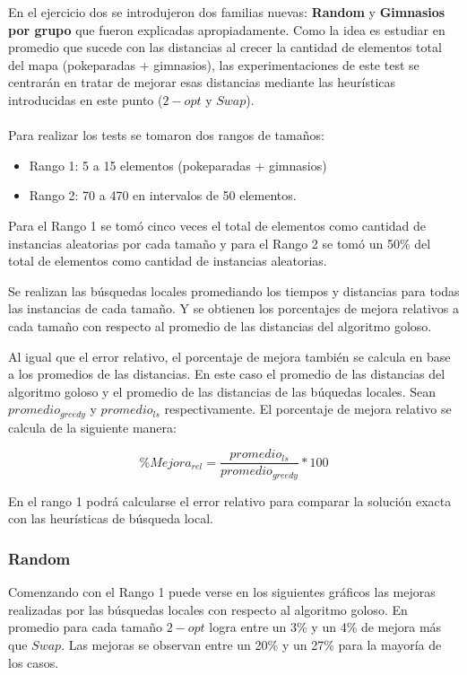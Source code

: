 \newpage

En el ejercicio dos se introdujeron dos familias nuevas: \textbf{Random} y \textbf{Gimnasios por grupo} que fueron explicadas apropiadamente. Como la idea es estudiar en promedio que sucede con las distancias al crecer la cantidad de elementos total del mapa (pokeparadas + gimnasios), las experimentaciones de este test se centrarán en tratar de mejorar esas distancias mediante las heurísticas introducidas en este punto ($2-opt$ y $Swap$).\\\\

Para realizar los tests se tomaron dos rangos de tamaños:
\begin{itemize}
\item Rango 1: 5 a 15 elementos (pokeparadas + gimnasios)
\item Rango 2: 70 a 470 en intervalos de 50 elementos.
\end{itemize}

Para el Rango 1 se tomó cinco veces el total de elementos como cantidad de instancias aleatorias por cada tamaño y para el Rango 2 se tomó un 50\% del total de elementos como cantidad de instancias aleatorias.

Se realizan las búsquedas locales promediando los tiempos y distancias para todas las instancias de cada tamaño. Y se obtienen los porcentajes de mejora relativos a cada tamaño con respecto al promedio de las distancias del algoritmo goloso.

Al igual que el error relativo, el porcentaje de mejora también se calcula en base a los promedios de las distancias. En este caso el promedio de las distancias del algoritmo goloso y el promedio de las distancias de las búquedas locales. Sean $promedio_{greedy}$ y $promedio_{ls}$ respectivamente. El porcentaje de mejora relativo se calcula de la siguiente manera:

\begin{equation}
\%Mejora_{rel} = \frac{promedio_{ls}}{promedio_{greedy}} \ast 100
\end{equation}

En el rango 1 podrá calcularse el error relativo para comparar la solución exacta con las heurísticas de búsqueda local.

\subsubsection*{Random}

Comenzando con el Rango 1 puede verse en los siguientes gráficos las mejoras realizadas por las búsquedas locales con respecto al algoritmo goloso. En promedio para cada tamaño $2-opt$ logra entre un 3\% y un 4\% de mejora más que $Swap$. Las mejoras se observan entre un 20\% y un 27\% para la mayoría de los casos.
\\\\

